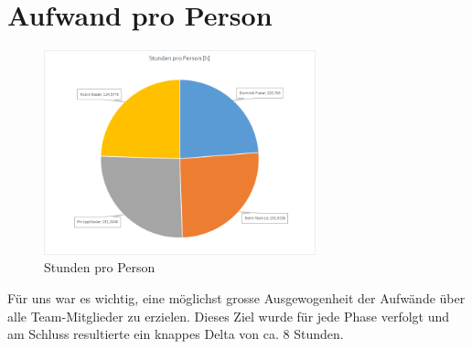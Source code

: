 	\section{Aufwand pro Person}
        \begin{figure}
            \vspace{-25pt}
            \begin{center}
                \includegraphics[width=0.7\textwidth]{content/schlussbericht/images/zeit_nach_person.png}
            \end{center}
            \vspace{-20pt}
            \caption{Stunden pro Person}
        \end{figure}
        Für uns war es wichtig, eine möglichst grosse Ausgewogenheit der Aufwände über alle Team-Mitglieder zu erzielen. Dieses Ziel wurde für jede Phase verfolgt und am Schluss resultierte ein knappes Delta von ca. 8 Stunden.
        \vspace{4cm}
	
